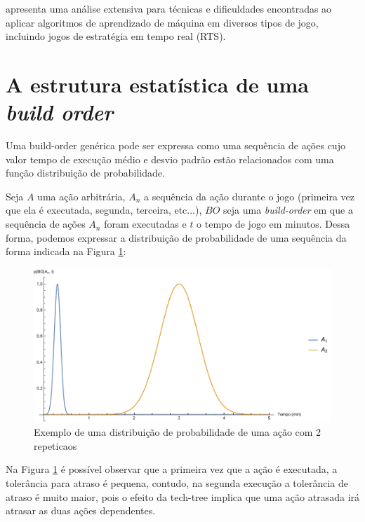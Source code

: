 \cite{synnaeve2011bayesian2} apresenta uma análise extensiva para técnicas e dificuldades encontradas ao aplicar algoritmos de aprendizado de máquina em diversos tipos de jogo, incluindo jogos de estratégia em tempo real (RTS).

		\section{A estrutura estatística de uma \textit{build order}}
Uma \gls{build-order} genérica pode ser expressa como uma sequência de ações cujo valor tempo de execução médio e desvio padrão estão relacionados com uma função distribuição de probabilidade.

Seja $A$ uma ação arbitrária, $A_n$ a sequência da ação durante o jogo (primeira vez que ela é executada, segunda, terceira, etc...), $BO$ seja uma \textit{\gls{build-order}} em que a sequência de ações $A_n$ foram executadas e $t$ o tempo de jogo em minutos. Dessa forma, podemos expressar a distribuição de probabilidade de uma sequência da forma indicada na Figura \ref{fig:rev-distribuicao-exemplo}:

\begin{figure}[htb]
	\caption{\label{fig:rev-distribuicao-exemplo}Exemplo de uma distribuição de probabilidade de uma ação com 2 \glspl{repeticao}}
	\begin{center}
	    \includegraphics[width=\linewidth]{../Mathematica/Distribuicao1.pdf}
	\end{center}
\end{figure}

Na Figura \ref{fig:rev-distribuicao-exemplo} é possível observar que a primeira vez que a ação é executada, a tolerância para atraso é pequena, contudo, na segunda execução a tolerância de atraso é muito maior, pois o efeito da \gls{tech-tree} implica que uma ação atrasada irá atrasar as duas ações dependentes.


